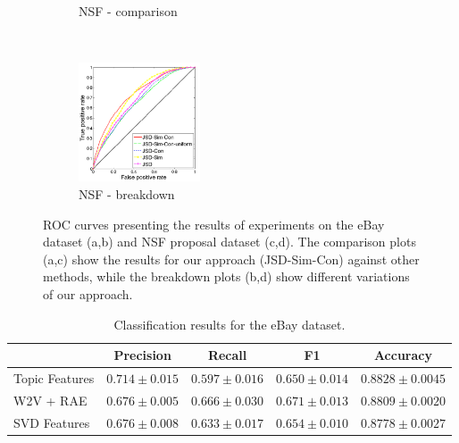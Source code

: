 \documentclass{article} %
\begin{document}
\begin{figure}
\begin{subfigure}[b]{0.24\textwidth}
                \caption{NSF - comparison}
                \label{fig:nsf-comparison}
        \end{subfigure}%
        ~ %
        \begin{subfigure}[b]{0.24\textwidth}
        	        \centering
                \includegraphics[width=36mm]{figures/nsf-breakdown-kopia.png}
               \caption{NSF - breakdown}
                \label{fig:nsf-breakdown}
        \end{subfigure}
       \caption{ROC curves presenting the results of experiments on
         the eBay dataset (a,b) and NSF proposal dataset (c,d). The
         comparison plots (a,c) show the results for our approach (JSD-Sim-Con)
         against other methods, while the breakdown plots (b,d)
         show different variations of our approach. }\label{fig:roc-curves}
\end{figure}

\begin{table}[t]
\caption{Classification results for the eBay dataset.}
\label{tab:classification-results}
\vspace{-4mm}
\begin{center}
\begin{tabular}{|l|c|c|c|c|}
\hline
&Precision & Recall & F1 & Accuracy
\\ \hline 
Topic Features         &$\mathbf{0.714}\pm 0.015$&$0.597\pm 0.016$&$0.650\pm
0.014$& $\mathbf{0.8828}\pm 0.0045$\\
W2V + RAE             &$0.676\pm 0.005$&$\mathbf{0.666}\pm 0.030$&$\mathbf{0.671}\pm
0.013$&$0.8809\pm 0.0020$ \\
SVD Features             &$0.676\pm 0.008$&$0.633\pm 0.017$&$0.654\pm
0.010$&$0.8778\pm 0.0027$\\
\hline
\end{tabular}
\end{center}
\end{table}

\end{document}

